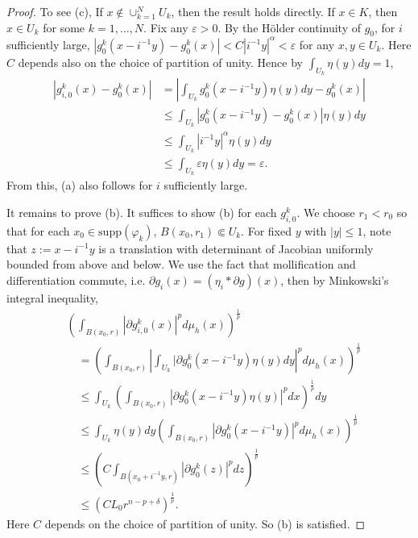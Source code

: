 \documentclass[12pt]{amsart}
\def\e{\varepsilon}
\theoremstyle{plain}
\theoremstyle{plain}
\theoremstyle{definition}
\theoremstyle{remark}
\numberwithin{equation}{subsection}
\begin{document}
\begin{proof}
To see (c), If $x\notin \cup_{k=1}^N U_k$, then the result holds directly.  If $x \in K$, then $x \in U_k$ for some $k = 1,\dots,N$. Fix any $\e>0$. By the H\"older continuity of $g_0$, for $i$ sufficiently large, $|g_0^k(x-i^{-1}y) - g_0^k(x)| < C|i^{-1}y|^\alpha <\varepsilon$ for any $x, y \in U_k$. Here $C$ depends also on the choice of partition of unity. Hence by $\int_{U_k} \eta(y)dy = 1$,
    \begin{align*}
        |g_{i,0}^k(x) - g_0^k(x)| &= \left|\int_{U_k} g_0^k(x-i^{-1}y)\eta(y)dy - g_0^k(x)\right| \nonumber \\
        &\leq \int_{U_k} | g_0^k(x-i^{-1}y) - g_0^k(x)|\eta(y)dy \nonumber \\
        &\leq \int_{U_k} |i^{-1}y|^\alpha \eta(y)dy \nonumber \\
        &\leq \int_{U_k} \varepsilon \eta(y)dy \nonumber = \varepsilon.
    \end{align*}
    From this, (a) also follows  for $i$ sufficiently large.
    
    
    
  It remains to prove (b). It suffices to show (b) for each $g_{i,0}^k$. We choose $r_1<r_0$ so that for each $x_0\in \mathrm{supp}(\varphi_k)$, $B(x_0,r_1)\Subset U_k$. For fixed $y$ with $|y| \leq 1$, note that $z:= x-i^{-1}y$ is a translation with determinant of Jacobian uniformly bounded from above and below. We use the fact that mollification and differentiation commute, i.e. $\partial g_i(x) = (\eta_i \ast \partial g)(x)$, then by Minkowski's integral inequality,
    \begin{align*}
        &\left(\int_{B(x_0,r)}|\partial g_{i,0}^k(x)|^pd\mu_h(x)\right)^\frac{1}{p} \nonumber \\
        &\quad= \left(\int_{B(x_0,r)}\left|\int_{U_k} |\partial g_0^k(x-i^{-1}y)\eta(y)dy\right|^{p}d\mu_h(x)\right)^\frac{1}{p} \nonumber \\
        &\quad\leq \int_{U_k} \left(\int_{B(x_0,r)}|\partial g_0^k(x-i^{-1}y)\eta(y)|^pdx\right)^\frac{1}{p}dy \nonumber \\
        &\quad\leq \int_{U_k}\eta(y)dy\left(\int_{B(x_0,r)} |\partial g_0^k(x-i^{-1}y)|^p d\mu_h(x)\right)^\frac{1}{p} \nonumber \\
        &\quad\leq \left(C\int_{B(x_0 + i^{-1}y, r)} |\partial g_0^k(z)|^p dz\right)^\frac{1}{p} \nonumber \\
        &\quad\leq \left(CL_0 r^{n-p+\delta}\right)^\frac{1}{p}.
    \end{align*}
 Here $C$ depends on the choice of partition of unity. So (b) is satisfied.
    

\end{proof}
\end{document}
